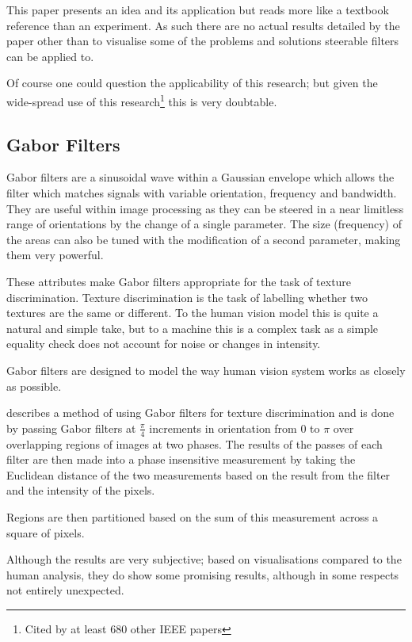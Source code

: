 \documentclass[conference]{IEEEtran}
\begin{document}
This paper presents an idea and its application but reads more like a textbook
reference than an experiment. As such there are no actual results detailed by
the paper other than to visualise some of the problems and solutions steerable
filters can be applied to.

Of course one could question the applicability of this research; but given the
wide-spread use of this research\footnote{Cited by at least 680 other IEEE
papers} this is very doubtable.

\subsection{Gabor Filters}

Gabor filters are a sinusoidal wave within a Gaussian
envelope\cite{gabor1946theory}\cite{daugman1985uncertainty} which allows the
filter which matches signals with variable orientation, frequency and
bandwidth. They are useful within image processing as they can be steered in a
near limitless range of orientations by the change of a single parameter. The
size (frequency) of the areas can also be tuned with the modification of a
second parameter, making them very powerful.

These attributes make Gabor filters appropriate for the task of texture
discrimination. Texture discrimination is the task of labelling whether two
textures are the same or different. To the human vision model this is quite a
natural and simple take, but to a machine this is a complex task as a simple
equality check does not account for noise or changes in intensity.

Gabor filters are designed to model the way human vision system works as
closely as possible.

\cite{turner1986texture} describes a method of using Gabor filters for texture
discrimination and is done by passing Gabor filters at $\frac{\pi}{4}$
increments in orientation from $0$ to $\pi$ over overlapping regions of images
at two phases. The results of the passes of each filter are then made into a
phase insensitive measurement by taking the Euclidean distance of the two
measurements based on the result from the filter and the intensity of the
pixels.

Regions are then partitioned based on the sum of this measurement across a
square of pixels.

Although the results are very subjective; based on visualisations compared to
the human analysis, they do show some promising results, although in some
respects not entirely unexpected.
\end{document}
